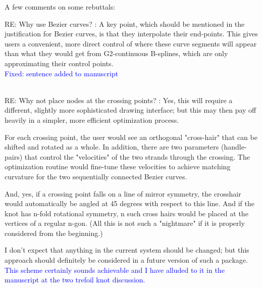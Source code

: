 \documentclass[12pt]{article}
\begin{document}
A few comments on some rebuttals:

RE: Why use Bezier curves? : A key point, which should be mentioned in
the justification for Bezier curves, is that they interpolate their
end-points. This gives users a convenient, more direct control of
where these curve segments will appear than what they would get from
G2-continuous B-splines, which are only approximating their control
points.\textcolor{blue}{\\Fixed: sentence added to manuscript\\ \\}

RE: Why not place nodes at the crossing points? : Yes, this will
require a different, slightly more sophisticated drawing interface;
but this may then pay off heavily in a simpler, more efficient
optimization process.

For each crossing point, the user would see an orthogonal "cross-hair"
that can be shifted and rotated as a whole.  In addition, there are
two parameters (handle-pairs) that control the "velocities" of the two
strands through the crossing.  The optimization routine would
fine-tune these velocities to achieve matching curvature for the two
sequentially connected Bezier curves.

And, yes, if a crossing point falls on a line of mirror symmetry, the
crosshair would automatically be angled at 45 degrees with respect to
this line.  And if the knot has n-fold rotational symmetry, n such
cross hairs would be placed at the vertices of a regular n-gon.  (All
this is not such a "nightmare" if it is properly considered from the
beginning.)

I don't expect that anything in the current system should be changed;
but this approach should definitely be considered in a future version
of such a package.
\textcolor{blue}{\\ This scheme certainly sounds achievable and I have
  alluded to it in the manuscript at the two trefoil knot
  discussion.\\ \\}
\end{document}
